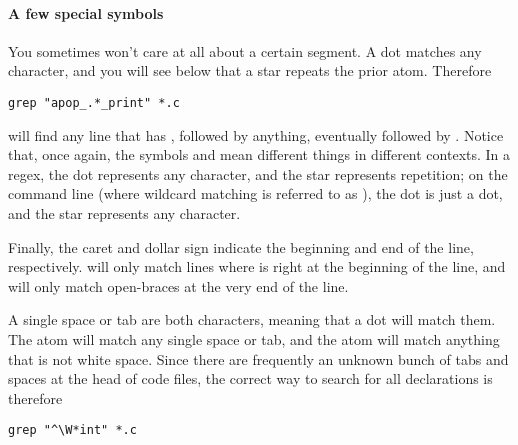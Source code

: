 \paragraph{A few special symbols}
You sometimes won't care at all about a certain segment. A 
dot matches any character, and you will see below that a star 
repeats the prior atom. Therefore
\begin{lstlisting}
grep "apop_.*_print" *.c
\end{lstlisting}
will find any line that has , followed by anything,
eventually followed by . Notice that, once again, the
symbols  and \ci{*} mean different things in different contexts.
In a regex, the dot represents any character, and the star represents
repetition; on the command line (where wildcard matching is referred to
as ), the dot is just a dot, and the star represents any
character.

Finally, the caret and dollar sign indicate the beginning and end of the
line, respectively.   will only match
lines where  is right at the beginning of the line, and 
 will only match open-braces at the very end of the
line. 

A single space or tab are both characters, meaning that a dot will
match them. The atom  will match any single space or tab,
and the atom  will match anything that is not white space.
Since there are frequently an unknown bunch of tabs and spaces at the
head of code files, the correct way to search for all 
declarations is therefore
\begin{lstlisting}
grep "^\W*int" *.c
\end{lstlisting}

